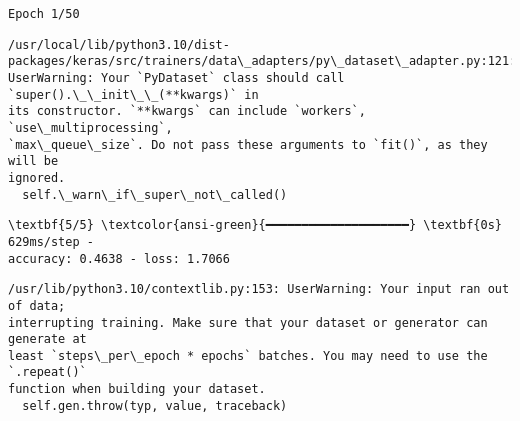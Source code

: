 \documentclass[11pt]{article}
\begin{document}
    \begin{Verbatim}[commandchars=\\\{\}]
Epoch 1/50
    \end{Verbatim}

    \begin{Verbatim}[commandchars=\\\{\}]
/usr/local/lib/python3.10/dist-
packages/keras/src/trainers/data\_adapters/py\_dataset\_adapter.py:121:
UserWarning: Your `PyDataset` class should call `super().\_\_init\_\_(**kwargs)` in
its constructor. `**kwargs` can include `workers`, `use\_multiprocessing`,
`max\_queue\_size`. Do not pass these arguments to `fit()`, as they will be
ignored.
  self.\_warn\_if\_super\_not\_called()
    \end{Verbatim}

    \begin{Verbatim}[commandchars=\\\{\}]
\textbf{5/5} \textcolor{ansi-green}{━━━━━━━━━━━━━━━━━━━━} \textbf{0s} 629ms/step -
accuracy: 0.4638 - loss: 1.7066
    \end{Verbatim}

    \begin{Verbatim}[commandchars=\\\{\}]
/usr/lib/python3.10/contextlib.py:153: UserWarning: Your input ran out of data;
interrupting training. Make sure that your dataset or generator can generate at
least `steps\_per\_epoch * epochs` batches. You may need to use the `.repeat()`
function when building your dataset.
  self.gen.throw(typ, value, traceback)
    \end{Verbatim}
\end{document}
